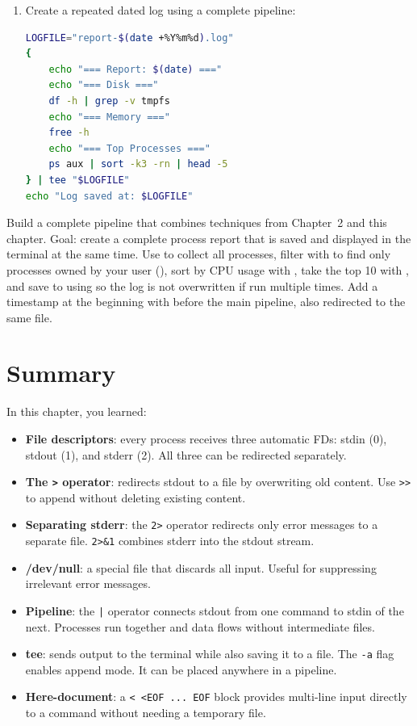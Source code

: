 \begin{enumerate}
    \item Create a repeated dated log using a complete pipeline:
\begin{lstlisting}[language=bash, caption={Dated log with pipeline and tee}]
LOGFILE="report-$(date +%Y%m%d).log"
{
    echo "=== Report: $(date) ==="
    echo "=== Disk ==="
    df -h | grep -v tmpfs
    echo "=== Memory ==="
    free -h
    echo "=== Top Processes ==="
    ps aux | sort -k3 -rn | head -5
} | tee "$LOGFILE"
echo "Log saved at: $LOGFILE"
\end{lstlisting}
\end{enumerate}

\begin{challengebox}
Build a complete pipeline that combines techniques from Chapter~2 and this chapter. Goal: create a complete process report that is saved and displayed in the terminal at the same time. Use  to collect all processes, filter with  to find only processes owned by your user (), sort by CPU usage with , take the top 10 with , and save to  using  so the log is not overwritten if run multiple times. Add a timestamp at the beginning with  before the main pipeline, also redirected to the same file.
\end{challengebox}

\section{Summary}

In this chapter, you learned:

\begin{itemize}[noitemsep,topsep=2pt]
    \item \textbf{File descriptors}: every process receives three automatic FDs: stdin (0), stdout (1), and stderr (2). All three can be redirected separately.
    \item \textbf{The \texttt{>} operator}: redirects stdout to a file by overwriting old content. Use \texttt{>>} to append without deleting existing content.
    \item \textbf{Separating stderr}: the \texttt{2>} operator redirects only error messages to a separate file. \texttt{2>\&1} combines stderr into the stdout stream.
    \item \textbf{/dev/null}: a special file that discards all input. Useful for suppressing irrelevant error messages.
    \item \textbf{Pipeline}: the \texttt{|} operator connects stdout from one command to stdin of the next. Processes run together and data flows without intermediate files.
    \item \textbf{tee}: sends output to the terminal while also saving it to a file. The \texttt{-a} flag enables append mode. It can be placed anywhere in a pipeline.
    \item \textbf{Here-document}: a \texttt{<\,<EOF ... EOF} block provides multi-line input directly to a command without needing a temporary file.
\end{itemize}

